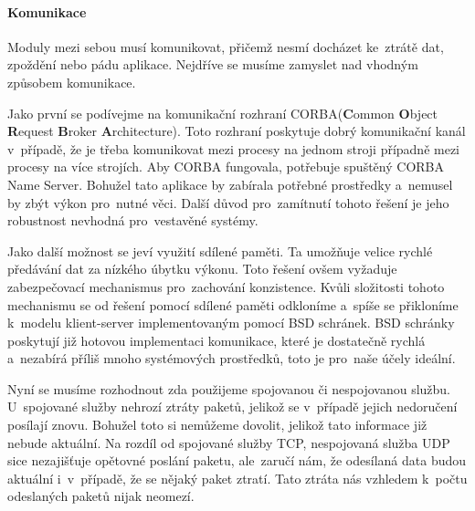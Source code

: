 		\paragraph{Komunikace}
		Moduly mezi sebou musí komunikovat, přičemž nesmí docházet ke~ztrátě dat, zpoždění nebo pádu aplikace. Nejdříve se musíme zamyslet nad vhodným způsobem komunikace.\par 
		Jako první se podívejme na komunikační rozhraní CORBA(\textbf{C}ommon \textbf{O}bject \textbf{R}equest \textbf{B}roker \textbf{A}rchitecture). Toto rozhraní poskytuje dobrý komunikační kanál v~případě, že je třeba komunikovat mezi procesy na jednom stroji případně mezi procesy na více strojích. Aby CORBA fungovala, potřebuje spuštěný CORBA Name Server. Bohužel tato aplikace by zabírala potřebné prostředky a~nemusel by zbýt výkon pro~nutné věci. Další důvod pro~zamítnutí tohoto řešení je jeho robustnost nevhodná pro~vestavěné systémy.\par
		Jako další možnost se jeví využití sdílené paměti. Ta umožňuje velice rychlé předávání dat za nízkého úbytku výkonu. Toto řešení ovšem vyžaduje zabezpečovací mechanismus pro~zachování konzistence. Kvůli složitosti tohoto mechanismu se od řešení pomocí sdílené paměti odkloníme a~spíše se přikloníme k~modelu klient-server implementovaným pomocí BSD schránek. BSD schránky poskytují již hotovou implementaci komunikace, které je dostatečně rychlá a~nezabírá příliš mnoho systémových prostředků, toto je pro~naše účely ideální.\par
		Nyní se musíme rozhodnout zda použijeme spojovanou či nespojovanou službu. U~spojované služby nehrozí ztráty paketů, jelikož se v~případě jejich nedoručení posílají znovu. Bohužel toto si nemůžeme dovolit, jelikož tato informace již nebude aktuální. Na rozdíl od spojované služby TCP, nespojovaná služba UDP sice nezajišťuje opětovné poslání paketu, ale~zaručí nám, že odesílaná data budou aktuální i~v~případě, že se nějaký paket ztratí. Tato ztráta nás vzhledem k~počtu odeslaných paketů nijak neomezí. 

